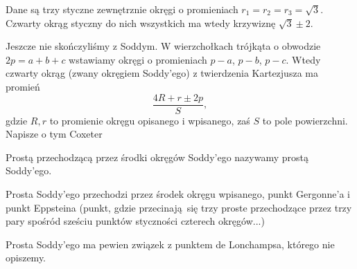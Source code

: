 \begin{example}
    Dane są trzy styczne zewnętrznie okręgi o promieniach $r_1 = r_2 = r_3 = \sqrt{3}$.
    Czwarty okrąg styczny do nich wszystkich ma wtedy krzywiznę $\sqrt 3 \pm 2$.
\end{example}

Jeszcze nie skończyliśmy z Soddym.
W wierzchołkach trójkąta o obwodzie $2p = a + b + c$ wstawiamy okręgi o promieniach $p - a$, $p - b$, $p - c$.
Wtedy czwarty okrąg (zwany okręgiem Soddy'ego) z twierdzenia Kartezjusza ma promień
\begin{equation}
    \frac{4R + r \pm 2p}{S},
\end{equation}
gdzie $R, r$ to promienie okręgu opisanego i wpisanego, zaś $S$ to pole powierzchni.
Napisze o tym Coxeter \cite[s. 29-31]{coxeter_1967}

\begin{definition}
    Prostą przechodzącą przez środki okręgów Soddy'ego nazywamy prostą Soddy'ego.
\end{definition}

\begin{proposition}
    Prosta Soddy'ego przechodzi przez środek okręgu wpisanego, punkt Gergonne'a i punkt Eppsteina (punkt, gdzie przecinają się trzy proste przechodzące przez trzy pary spośród sześciu punktów styczności czterech okręgów...)
%
\end{proposition}

Prosta Soddy'ego ma pewien związek z punktem de Lonchampsa, którego nie opiszemy.
%

%